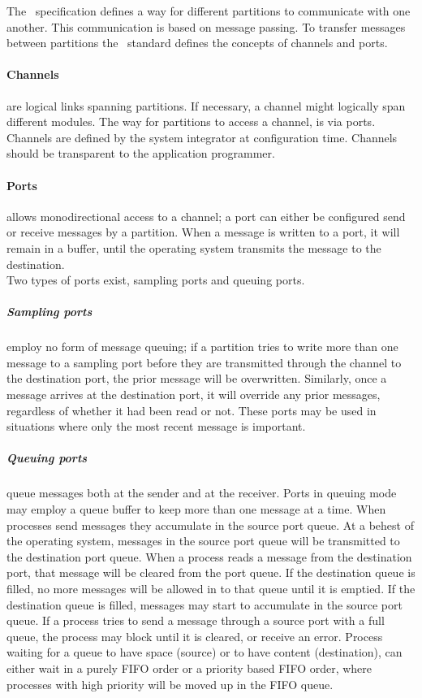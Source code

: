 \iffalse
The \arinc\ specification defines a way for different partitions to communicate with one another.
This communication is based on message passing. To transfer messages between partitions the \arinc\ standard
defines the concepts of channels and ports.

\paragraph{Channels} are logical links spanning partitions. If necessary, 
a channel might logically span different modules. 
The way for partitions to access a channel, is via ports.
Channels are defined by the system integrator at configuration time.
Channels should be transparent to the application programmer.

\paragraph{Ports} allows monodirectional access to a channel;
a port can either be configured send or receive messages by a partition.
When a message is written to a port, it will remain in a buffer, until the operating system transmits the message to the destination.\\

Two types of ports exist, sampling ports and queuing ports. 
\subparagraph{Sampling ports} employ no form of message queuing; if a partition tries to write more than one message to a sampling port
before they are transmitted through the channel to the destination port, the prior message will be overwritten. Similarly, once a message arrives at the destination port,
it will override any prior messages, regardless of whether it had been read or not. These ports may be used in situations where only the most recent message is important.
\subparagraph{Queuing ports} queue messages both at the sender and at the receiver. Ports in queuing mode may employ a queue buffer to keep more than one message at a time.
When processes send messages they accumulate in the source port queue. At a behest of the operating system, messages in the source port queue will be transmitted to the destination port queue.
When a process reads a message from the destination port, that message will be cleared from the port queue. If the destination queue is filled, no more messages will be allowed
in to that queue until it is emptied. If the destination queue is filled, messages may start to accumulate in the source port queue. If a process tries to send a message through a
source port with a full queue, the process may block until it is cleared, or receive an error.
Process waiting for a queue to have space (source) or to have content (destination), can either wait in a purely FIFO order or a priority based FIFO order, where processes with high priority
will be moved up in the FIFO queue.\\

